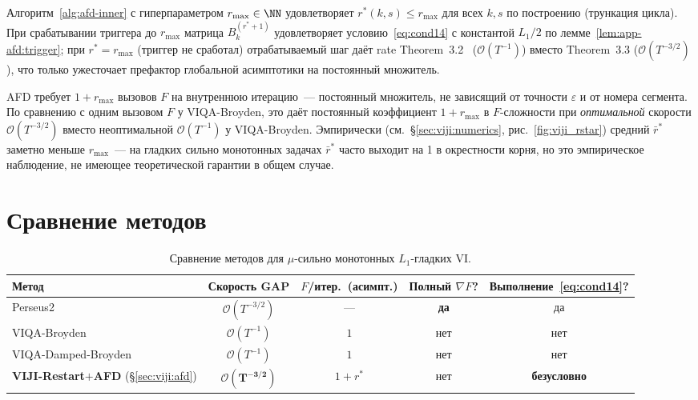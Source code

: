 \begin{proposition}
\label{prop:rstar-main}
Алгоритм~\ref{alg:afd-inner} с гиперпараметром $r_{\max} \in \NN$ удовлетворяет
$r^{*}(k, s) \le r_{\max}$ для всех $k, s$ по построению (трункация цикла).
При срабатывании триггера до $r_{\max}$ матрица $B_k^{(r^{*}+1)}$ удовлетворяет
условию~\eqref{eq:cond14} с константой $L_1/2$ по
лемме~\ref{lem:app-afd:trigger}; при $r^{*} = r_{\max}$ (триггер не сработал)
отрабатываемый шаг даёт rate Theorem~3.2~\cite{Agafonov2024VIJI}
($\mathcal O(T^{-1})$) вместо Theorem~3.3 ($\mathcal O(T^{-3/2})$),
что только ужесточает префактор глобальной асимптотики на постоянный множитель.
\end{proposition}

\begin{remark}
\label{rem:cost}
AFD требует $1 + r_{\max}$ вызовов $F$ на внутреннюю итерацию~---
постоянный множитель, не зависящий от точности $\varepsilon$ и от
номера сегмента. По сравнению с одним вызовом $F$ у VIQA-Broyden,
это даёт постоянный коэффициент $1+r_{\max}$ в $F$-сложности при
\emph{оптимальной} скорости $\mathcal O(T^{-3/2})$ вместо неоптимальной
$\mathcal O(T^{-1})$ у VIQA-Broyden. Эмпирически (см.\
\S\ref{sec:viji:numerics}, рис.~\ref{fig:viji_rstar}) средний $\bar r^{*}$
заметно меньше $r_{\max}$~--- на гладких сильно монотонных задачах
$\bar r^{*}$ часто выходит на 1 в окрестности корня, но это эмпирическое
наблюдение, не имеющее теоретической гарантии в общем случае.
\end{remark}

\section{Сравнение методов}
\label{sec:viji:comparison}

\begin{table}[h]
\centering
\small
\begin{tabularx}{\textwidth}{@{}>{\raggedright\arraybackslash}Xcccc@{}}
\toprule
Метод & Скорость GAP & $F$/итер.\ (асимпт.) & Полный $\nabla F$? & Выполнение~\eqref{eq:cond14}? \\
\midrule
Perseus2~\cite{Lin2022Perseus}              & $\mathcal O(T^{-3/2})$ & ---           & \textbf{да} & да \\
VIQA-Broyden~\cite{Agafonov2024VIJI}        & $\mathcal O(T^{-1})$   & $1$           & нет         & нет \\
VIQA-Damped-Broyden~\cite{Agafonov2024VIJI} & $\mathcal O(T^{-1})$   & $1$           & нет         & нет \\
\midrule
\textbf{VIJI-Restart${+}$AFD} (\S\ref{sec:viji:afd}) &
  $\mathbf{\mathcal O(T^{-3/2})}$                            & $1 + r^{*}$   & нет         & \textbf{безусловно} \\
\bottomrule
\end{tabularx}
\caption{Сравнение методов для $\mu$-сильно монотонных $L_1$-гладких VI.}
\label{tab:compare}
\end{table}

